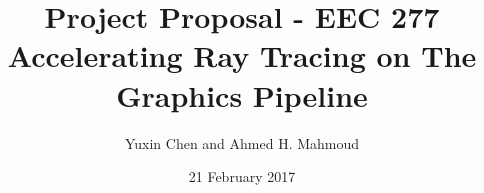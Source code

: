 \documentclass[12pt] {article}
\begin{document}
\title{Project Proposal - EEC 277\\
\vspace{2mm}
Accelerating Ray Tracing on The Graphics Pipeline}

\author{Yuxin Chen and Ahmed H. Mahmoud}
\date{21 February 2017} 
\maketitle














\end{document}
